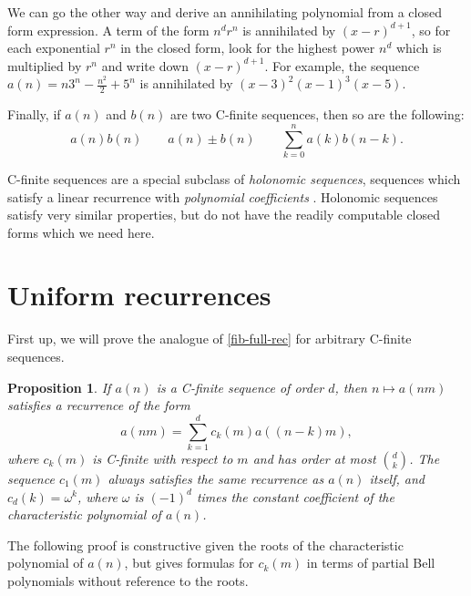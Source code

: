 \documentclass[12pt]{article}
\newtheorem{proposition}{Proposition}
\begin{document}
We can go the other way and derive an annihilating polynomial from a closed
form expression. A term of the form $n^d r^n$ is annihilated by $(x - r)^{d +
1}$, so for each exponential $r^n$ in the closed form, look for the highest
power $n^d$ which is multiplied by $r^n$ and write down $(x - r)^{d + 1}$. For
example, the sequence $a(n) = n 3^n - \frac{n^2}{2} + 5^n$ is annihilated by
$(x - 3)^2 (x - 1)^3 (x - 5)$.

Finally, if $a(n)$ and $b(n)$ are two C-finite sequences, then so are the
following:
\begin{equation*}
    a(n) b(n) \qquad a(n) \pm b(n) \qquad \sum_{k = 0}^n a(k) b(n - k).
\end{equation*}

C-finite sequences are a special subclass of \emph{holonomic sequences},
sequences which satisfy a linear recurrence with \emph{polynomial coefficients}
\cite{holonomic}. Holonomic sequences satisfy very similar properties, but do
not have the readily computable closed forms which we need here.

\section{Uniform recurrences}%
\label{sec:uniform_recurrences}

First up, we will prove the analogue of \eqref{fib-full-rec} for arbitrary
C-finite sequences.

\begin{proposition}
    \label{uniform-rec}
    If $a(n)$ is a C-finite sequence of order $d$, then $n \mapsto a(nm)$
    satisfies a recurrence of the form
    \begin{equation}
        a(nm) = \sum_{k = 1}^d c_k(m) a((n - k)m),
    \end{equation}
    where $c_k(m)$ is C-finite with respect to $m$ and has order at most ${d
    \choose k}$. The sequence $c_1(m)$ always satisfies the same recurrence as
    $a(n)$ itself, and $c_d(k) = \omega^k$, where $\omega$ is $(-1)^d$ times
    the constant coefficient of the characteristic polynomial of $a(n)$.
\end{proposition}

The following proof is constructive given the roots of the characteristic
polynomial of $a(n)$, but \cite{birmajer} gives formulas for $c_k(m)$ in terms
of partial Bell polynomials without reference to the roots.
\end{document}
